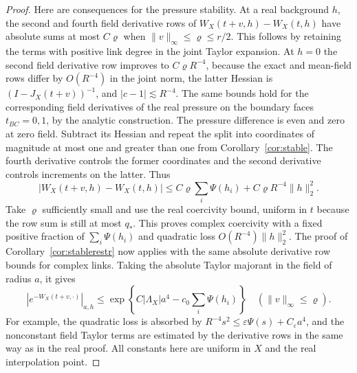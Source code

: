 \documentclass[11pt]{article}
\begin{document}
\begin{proof}
Here are consequences for the pressure stability. At a real
background \(h\), the second and fourth field derivative rows
of \(W_X(t+v,h)-W_X(t,h)\) have absolute sums at most
\(C\varrho\) when \(\|v\|_\infty\le\varrho\le r/2\). This follows
by retaining the terms with positive link degree in the joint
Taylor expansion. At \(h=0\) the second field derivative row
improves to \(C\varrho R^{-4}\), because the exact and mean-field
rows differ by \(O(R^{-4})\) in the joint norm, the latter
Hessian is \((I-J_X(t+v))^{-1}\), and \(|c-1|\lesssim R^{-4}\).
The same bounds hold for the corresponding field derivatives
of the real pressure on the boundary faces \(t_{BC}=0,1\), by
the analytic construction. The pressure difference is even and
zero at zero field. Subtract its Hessian and repeat the split
into coordinates of magnitude at most one and greater than one
from Corollary~\ref{cor:stable}. The fourth derivative controls
the former coordinates and the second derivative controls
increments on the latter. Thus
\[
 |W_X(t+v,h)-W_X(t,h)|
 \le C\varrho\sum_i\Psi(h_i)+C\varrho R^{-4}\|h\|_2^2.
\]
Take \(\varrho\) sufficiently small and use the real coercivity
bound, uniform in \(t\) because the row sum is still at most
\(q_*\). This proves complex coercivity with a fixed positive
fraction of \(\sum_i\Psi(h_i)\) and quadratic loss
\(O(R^{-4})\|h\|_2^2\). The proof of
Corollary~\ref{cor:stablerestr} now applies with the same
absolute derivative row bounds for complex links. Taking the
absolute Taylor majorant in the field of radius \(a\), it gives
\begin{equation}\label{eq:forest_complex}
 |e^{-W_X(t+v,\cdot)}|_{a,h}
 \le \exp\!\left\{C|\Lambda_X|a^4-c_0\sum_i\Psi(h_i)\right\}
 \quad (\|v\|_\infty\le\varrho).
\end{equation}
For example, the quadratic loss is absorbed by
\(R^{-4}s^2\le \varepsilon\Psi(s)+C_\varepsilon a^4\), and the
nonconstant field Taylor terms are estimated by the derivative
rows in the same way as in the real proof. All constants here
are uniform in \(X\) and the real interpolation point.


\end{proof}
\end{document}
